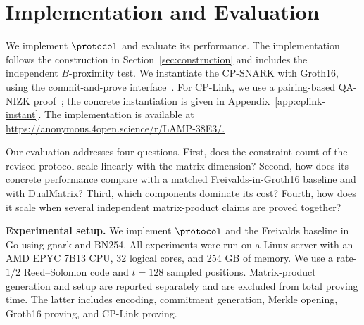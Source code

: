 \section{Implementation and Evaluation}
\label{sec:implementation}

We implement \(\protocol\) and evaluate its performance.  The implementation
follows the construction in Section~\ref{sec:construction} and includes the
independent \(B\)-proximity test.  We instantiate the CP-SNARK with Groth16,
using the commit-and-prove interface~\cite{gnark,legosnark}.  For CP-Link, we
use a pairing-based QA-NIZK proof~\cite{qa-nizk}; the concrete instantiation is
given in Appendix~\ref{app:cplink-instant}.  The implementation is available at
\url{https://anonymous.4open.science/r/LAMP-38E3/.}

Our evaluation addresses four questions.  First, does the constraint count of
the revised protocol scale linearly with the matrix dimension?  Second, how
does its concrete performance compare with a matched Freivalds-in-Groth16
baseline and with DualMatrix?  Third, which components dominate its cost?
Fourth, how does it scale when several independent matrix-product claims are
proved together?

\noindent\textbf{Experimental setup.}
We implement \(\protocol\) and the Freivalds baseline in Go using gnark and
BN254.  All experiments were run on a Linux server with an AMD EPYC 7B13 CPU,
32 logical cores, and 254 GB of memory.  We use a rate-\(1/2\) Reed--Solomon
code and \(t=128\) sampled positions.  Matrix-product generation and setup are
reported separately and are excluded from total proving time.  The latter
includes encoding, commitment generation, Merkle opening, Groth16 proving, and
CP-Link proving.

